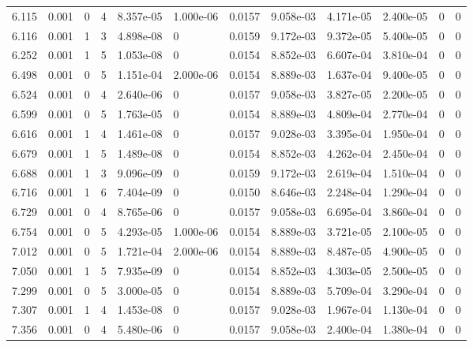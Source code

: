 \documentclass[preview]{standalone}
\begin{document}
{{{\begin{tabular}{L{1.2cm}C{1.2cm} C{0.3cm}C{0.5cm} C{1.4cm}C{1.4cm} C{1.4cm}C{1.4cm} C{1.6cm}C{1.6cm} C{1.6cm}C{1.6cm}}
  6.115  &  0.001  & 0     &  4 &  8.357e-05  & 1.000e-06  &  0.0157&   9.058e-03& 4.171e-05 & 2.400e-05   &  0 & 0  \\ 
  6.116  &  0.001  & 1     &  3 &  4.898e-08  & 0  &  0.0159&   9.172e-03& 9.372e-05 & 5.400e-05   &  0 & 0  \\ 
  6.252  &  0.001  & 1     &  5 &  1.053e-08  & 0  &  0.0154&   8.852e-03& 6.607e-04 & 3.810e-04   &  0 & 0  \\ 
  6.498  &  0.001  & 0     &  5 &  1.151e-04  & 2.000e-06  &  0.0154&   8.889e-03& 1.637e-04 & 9.400e-05   &  0 & 0  \\ 
  6.524  &  0.001  & 0     &  4 &  2.640e-06  & 0  &  0.0157&   9.058e-03& 3.827e-05 & 2.200e-05   &  0 & 0  \\ 
  6.599  &  0.001  & 0     &  5 &  1.763e-05  & 0  &  0.0154&   8.889e-03& 4.809e-04 & 2.770e-04   &  0 & 0  \\ 
  6.616  &  0.001  & 1     &  4 &  1.461e-08  & 0  &  0.0157&   9.028e-03& 3.395e-04 & 1.950e-04   &  0 & 0  \\ 
  6.679  &  0.001  & 1     &  5 &  1.489e-08  & 0  &  0.0154&   8.852e-03& 4.262e-04 & 2.450e-04   &  0 & 0  \\ 
  6.688  &  0.001  & 1     &  3 &  9.096e-09  & 0  &  0.0159&   9.172e-03& 2.619e-04 & 1.510e-04   &  0 & 0  \\ 
  6.716  &  0.001  & 1     &  6 &  7.404e-09  & 0  &  0.0150&   8.646e-03& 2.248e-04 & 1.290e-04   &  0 & 0  \\ 
  6.729  &  0.001  & 0     &  4 &  8.765e-06  & 0  &  0.0157&   9.058e-03& 6.695e-04 & 3.860e-04   &  0 & 0  \\ 
  6.754  &  0.001  & 0     &  5 &  4.293e-05  & 1.000e-06  &  0.0154&   8.889e-03& 3.721e-05 & 2.100e-05   &  0 & 0  \\ 
  7.012  &  0.001  & 0     &  5 &  1.721e-04  & 2.000e-06  &  0.0154&   8.889e-03& 8.487e-05 & 4.900e-05   &  0 & 0  \\ 
  7.050  &  0.001  & 1     &  5 &  7.935e-09  & 0  &  0.0154&   8.852e-03& 4.303e-05 & 2.500e-05   &  0 & 0  \\ 
  7.299  &  0.001  & 0     &  5 &  3.000e-05  & 0  &  0.0154&   8.889e-03& 5.709e-04 & 3.290e-04   &  0 & 0  \\ 
  7.307  &  0.001  & 1     &  4 &  1.453e-08  & 0  &  0.0157&   9.028e-03& 1.967e-04 & 1.130e-04   &  0 & 0  \\ 
  7.356  &  0.001  & 0     &  4 &  5.480e-06  & 0  &  0.0157&   9.058e-03& 2.400e-04 & 1.380e-04   &  0 & 0  \\ 

\end{tabular}}}}
\end{document}
